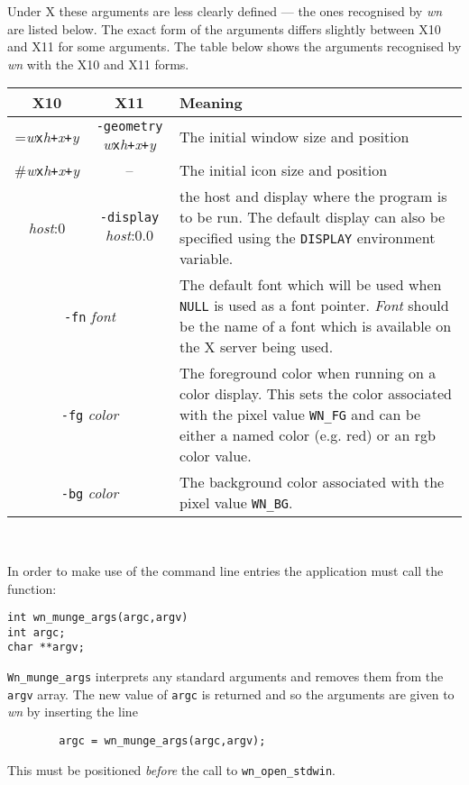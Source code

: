 Under X these arguments are less clearly defined --- the ones recognised
by {\em wn} are listed below.
The exact form of the arguments differs slightly between X10 and X11
for some arguments.
The table below shows the arguments recognised by {\em wn} with the
X10 and X11 forms.
%
%
\newcommand{\xgeom}{{\it w}{\tt x}{\it h}{\tt +}{\it x}{\tt +}{\it y}}
%
\begin{center}
\begin{tabular}{|c|c|p{3.5in}|} \hline
{\bf X10} & {\bf X11} & {\bf Meaning} \\ \hline \hline
=\xgeom & {\tt -geometry} \xgeom & The initial
window size and position \\ \hline
\#\xgeom & -- & The initial icon size and position \\ \hline
{\it host}:0 & {\tt -display} {\it host}:0.0 & the host and display
where the program is to be run. The default display can also
be specified using the {\tt DISPLAY} environment variable. \\ \hline
\multicolumn{2}{|c|}{{\tt -fn} {\it font}} & The default font which will be used
when {\tt NULL} is used as a font pointer. {\it Font} should be
the name of a font which is available on the X server being used. \\ \hline
\multicolumn{2}{|c|}{{\tt -fg} {\it color}} & The foreground color when running
on a color display. This sets the color associated with the pixel value {\tt WN\_FG}
and can be either a named color (e.g. red) or an rgb color
value. \\ \hline
\multicolumn{2}{|c|}{{\tt -bg} {\it color}} &  The background color associated with the
pixel value {\tt WN\_BG}. \\ \hline
\end{tabular}\\
\end{center}
In order to make use of the command line entries the
application must call the function:
\begin{verbatim}
int wn_munge_args(argc,argv)
int argc;
char **argv;
\end{verbatim}
{\tt Wn\_munge\_args} interprets any standard arguments and removes them from
the {\tt argv} array. The new value of {\tt argc} is returned and so the
arguments are given to {\em wn} by inserting the line
\begin{verbatim}
        argc = wn_munge_args(argc,argv);
\end{verbatim}
This must be positioned {\em before} the call to {\tt wn\_open\_stdwin}.

